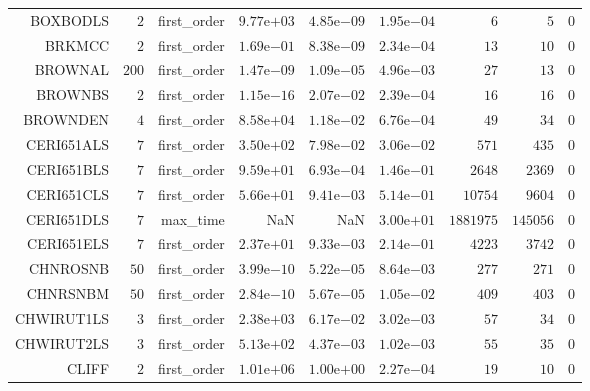 \begin{longtable}{rrrrrrrrr}
BOXBODLS & \(     2\) & first\_order & \( 9.77\)e\(+03\) & \( 4.85\)e\(-09\) & \( 1.95\)e\(-04\) & \(     6\) & \(     5\) & \(     0\) \\
BRKMCC & \(     2\) & first\_order & \( 1.69\)e\(-01\) & \( 8.38\)e\(-09\) & \( 2.34\)e\(-04\) & \(    13\) & \(    10\) & \(     0\) \\
BROWNAL & \(   200\) & first\_order & \( 1.47\)e\(-09\) & \( 1.09\)e\(-05\) & \( 4.96\)e\(-03\) & \(    27\) & \(    13\) & \(     0\) \\
BROWNBS & \(     2\) & first\_order & \( 1.15\)e\(-16\) & \( 2.07\)e\(-02\) & \( 2.39\)e\(-04\) & \(    16\) & \(    16\) & \(     0\) \\
BROWNDEN & \(     4\) & first\_order & \( 8.58\)e\(+04\) & \( 1.18\)e\(-02\) & \( 6.76\)e\(-04\) & \(    49\) & \(    34\) & \(     0\) \\
CERI651ALS & \(     7\) & first\_order & \( 3.50\)e\(+02\) & \( 7.98\)e\(-02\) & \( 3.06\)e\(-02\) & \(   571\) & \(   435\) & \(     0\) \\
CERI651BLS & \(     7\) & first\_order & \( 9.59\)e\(+01\) & \( 6.93\)e\(-04\) & \( 1.46\)e\(-01\) & \(  2648\) & \(  2369\) & \(     0\) \\
CERI651CLS & \(     7\) & first\_order & \( 5.66\)e\(+01\) & \( 9.41\)e\(-03\) & \( 5.14\)e\(-01\) & \( 10754\) & \(  9604\) & \(     0\) \\
CERI651DLS & \(     7\) & max\_time &       NaN &       NaN & \( 3.00\)e\(+01\) & \(1881975\) & \(145056\) & \(     0\) \\
CERI651ELS & \(     7\) & first\_order & \( 2.37\)e\(+01\) & \( 9.33\)e\(-03\) & \( 2.14\)e\(-01\) & \(  4223\) & \(  3742\) & \(     0\) \\
CHNROSNB & \(    50\) & first\_order & \( 3.99\)e\(-10\) & \( 5.22\)e\(-05\) & \( 8.64\)e\(-03\) & \(   277\) & \(   271\) & \(     0\) \\
CHNRSNBM & \(    50\) & first\_order & \( 2.84\)e\(-10\) & \( 5.67\)e\(-05\) & \( 1.05\)e\(-02\) & \(   409\) & \(   403\) & \(     0\) \\
CHWIRUT1LS & \(     3\) & first\_order & \( 2.38\)e\(+03\) & \( 6.17\)e\(-02\) & \( 3.02\)e\(-03\) & \(    57\) & \(    34\) & \(     0\) \\
CHWIRUT2LS & \(     3\) & first\_order & \( 5.13\)e\(+02\) & \( 4.37\)e\(-03\) & \( 1.02\)e\(-03\) & \(    55\) & \(    35\) & \(     0\) \\
CLIFF & \(     2\) & first\_order & \( 1.01\)e\(+06\) & \( 1.00\)e\(+00\) & \( 2.27\)e\(-04\) & \(    19\) & \(    10\) & \(     0\) \\

\end{longtable}

